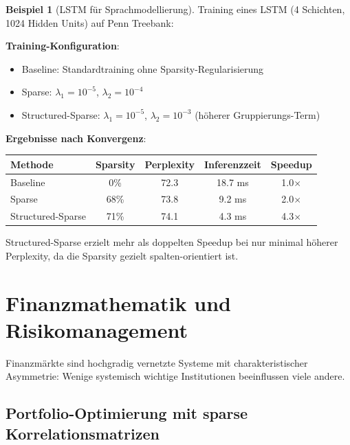 \documentclass[a4paper,12pt]{report}
\theoremstyle{definition}
\newtheorem{beispiel}{Beispiel}
\begin{document}
	\begin{beispiel}[LSTM für Sprachmodellierung]
		Training eines LSTM (4 Schichten, 1024 Hidden Units) auf Penn Treebank:
		
		\textbf{Training-Konfiguration}:
		\begin{itemize}
			\item Baseline: Standardtraining ohne Sparsity-Regularisierung
			\item Sparse: $\lambda_1 = 10^{-5}$, $\lambda_2 = 10^{-4}$
			\item Structured-Sparse: $\lambda_1 = 10^{-5}$, $\lambda_2 = 10^{-3}$ (höherer Gruppierungs-Term)
		\end{itemize}
		
		\textbf{Ergebnisse nach Konvergenz}:
		\begin{center}
			\begin{tabular}{|l|c|c|c|c|}
				\hline
				\textbf{Methode} & \textbf{Sparsity} & \textbf{Perplexity} & \textbf{Inferenzzeit} & \textbf{Speedup} \\
				\hline
				Baseline & 0\% & 72.3 & 18.7 ms & 1.0$\times$ \\
				Sparse & 68\% & 73.8 & 9.2 ms & 2.0$\times$ \\
				Structured-Sparse & 71\% & 74.1 & 4.3 ms & 4.3$\times$ \\
				\hline
			\end{tabular}
		\end{center}
		
		Structured-Sparse erzielt mehr als doppelten Speedup bei nur minimal höherer Perplexity, da die Sparsity gezielt spalten-orientiert ist.
	\end{beispiel}
	
	\section{Finanzmathematik und Risikomanagement}
	
	Finanzmärkte sind hochgradig vernetzte Systeme mit charakteristischer Asymmetrie: Wenige systemisch wichtige Institutionen beeinflussen viele andere.
	
	\subsection{Portfolio-Optimierung mit sparse Korrelationsmatrizen}
	
\end{document}
